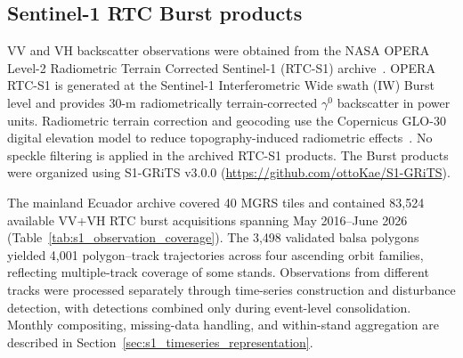 \subsection{Sentinel-1 RTC Burst products}
\label{sec:observation_design}

VV and VH backscatter observations were obtained from the NASA OPERA Level-2 Radiometric Terrain Corrected Sentinel-1 (RTC-S1) archive~\citep{shiroma2023OPERARTC,opera2023rtc}. OPERA RTC-S1 is generated at the Sentinel-1 Interferometric Wide swath (IW) Burst level and provides 30-m radiometrically terrain-corrected $\gamma^{0}$ backscatter in power units. Radiometric terrain correction and geocoding use the Copernicus GLO-30 digital elevation model to reduce topography-induced radiometric effects~\citep{Small2011RTC,shiroma2023OPERARTC}. No speckle filtering is applied in the archived RTC-S1 products. The Burst products were organized using S1-GRiTS v3.0.0 (\url{https://github.com/ottoKae/S1-GRiTS}).

The mainland Ecuador archive covered 40 MGRS tiles and contained 83,524 available VV+VH RTC burst acquisitions spanning May 2016–June 2026 (Table~\ref{tab:s1_observation_coverage}). The 3,498 validated balsa polygons yielded 4,001 polygon--track trajectories across four ascending orbit families, reflecting multiple-track coverage of some stands. Observations from different tracks were processed separately through time-series construction and disturbance detection, with detections combined only during event-level consolidation. Monthly compositing, missing-data handling, and within-stand aggregation are described in Section~\ref{sec:s1_timeseries_representation}.  


